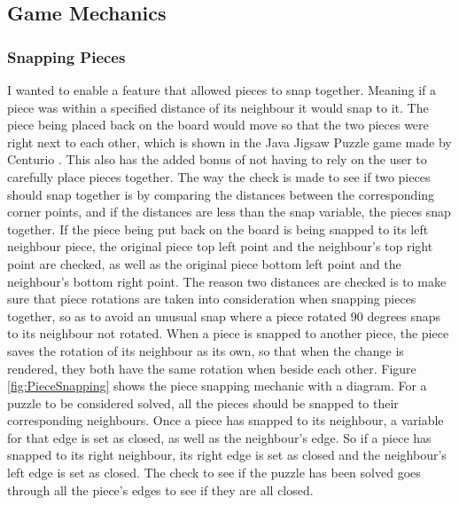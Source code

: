 \documentclass{article}
\begin{document}
\subsection{Game Mechanics}

\subsubsection{Snapping Pieces}
I wanted to enable a feature that allowed pieces to snap together. Meaning if a
piece was within a specified distance of its neighbour it would snap to it. The
piece being placed back on the board would move so that the two pieces were
right next to each other, which is shown in the Java Jigsaw Puzzle game made by
Centurio \cite{ref:SourceJigsaw}. This also has the added bonus of not having to
rely on the user to carefully place pieces together. The way the check is made
to see if two pieces should snap together is by comparing the distances between
the corresponding corner points, and if the distances are less than the snap
variable, the pieces snap together. If the piece being put back on the board is
being snapped to its left neighbour piece, the original piece top left point and
the neighbour's top right point are checked, as well as the original piece
bottom left point and the neighbour's bottom right point. The reason two
distances are checked is to make sure that piece rotations are taken into
consideration when snapping pieces together, so as to avoid an unusual snap
where a piece rotated 90 degrees snaps to its neighbour not rotated. When a
piece is snapped to another piece, the piece saves the rotation of its neighbour
as its own, so that when the change is rendered, they both have the same
rotation when beside each other. Figure \ref{fig:PieceSnapping} shows the piece
snapping mechanic with a diagram. For a puzzle to be considered solved, all the
pieces should be snapped to their corresponding neighbours. Once a piece has
snapped to its neighbour, a variable for that edge is set as closed, as well as
the neighbour's edge. So if a piece has snapped to its right neighbour, its
right edge is set as closed and the neighbour's left edge is set as closed. The
check to see if the puzzle has been solved goes through all the piece's edges to
see if they are all closed.
\end{document}

